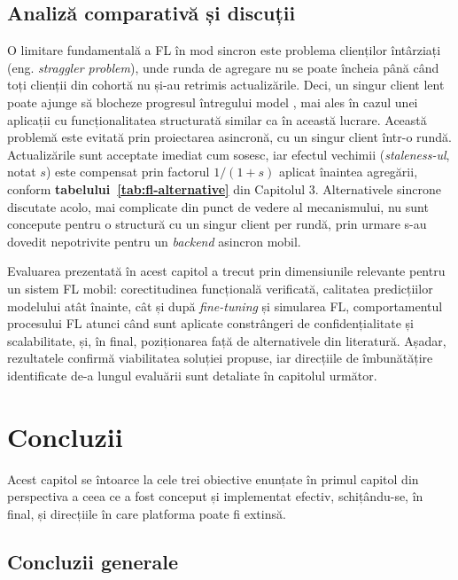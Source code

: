 \documentclass[12pt,a4paper]{report}
\begin{document}
\section{Analiză comparativă și discuții}

O limitare fundamentală a FL în mod sincron este problema clienților întârziați (eng. \textit{straggler problem}), unde runda de agregare nu se poate încheia până când toți clienții din cohortă nu și-au retrimis actualizările. Deci, un singur client lent poate ajunge să blocheze progresul întregului model \cite{kairouz2021advances}, mai ales în cazul unei aplicații cu funcționalitatea structurată similar ca în această lucrare. Această problemă este evitată prin proiectarea asincronă, cu un singur client într-o rundă. Actualizările sunt acceptate imediat cum sosesc, iar efectul vechimii (\textit{staleness-ul}, notat $s$) este compensat prin factorul $1/(1+s)$ aplicat înaintea agregării, conform \textbf{tabelului~\ref{tab:fl-alternative}} din Capitolul 3. Alternativele sincrone discutate acolo, mai complicate din punct de vedere al mecanismului, nu sunt concepute pentru o structură cu un singur client per rundă, prin urmare s-au dovedit nepotrivite pentru un \textit{backend} asincron mobil.

Evaluarea prezentată în acest capitol a trecut prin dimensiunile relevante pentru un sistem FL mobil: corectitudinea funcțională verificată, calitatea predicțiilor modelului atât înainte, cât și după \textit{fine-tuning} și simularea FL, comportamentul procesului FL atunci când sunt aplicate constrângeri de confidențialitate și scalabilitate, și, în final, poziționarea față de alternativele din literatură. Așadar, rezultatele confirmă viabilitatea soluției propuse, iar direcțiile de îmbunătățire identificate de-a lungul evaluării sunt detaliate în capitolul următor.

\chapter{Concluzii}

Acest capitol se întoarce la cele trei obiective enunțate în primul capitol din perspectiva a ceea ce a fost conceput și implementat efectiv, schițându-se, în final, și direcțiile în care platforma poate fi extinsă.

\section{Concluzii generale}
\end{document}
